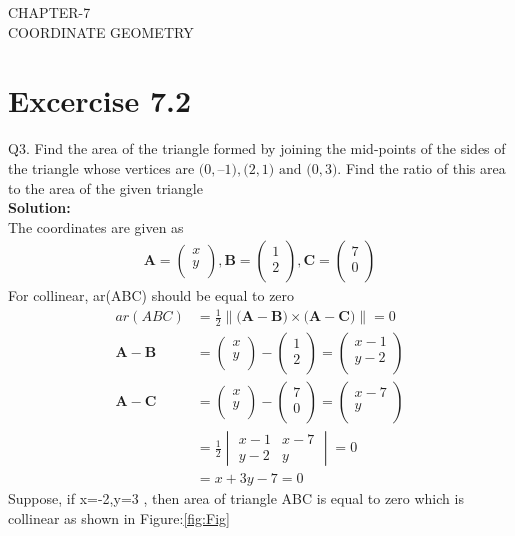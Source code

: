 \documentclass[12pt]{article}
\newcommand{\mydet}[1]{\ensuremath{\begin{vmatrix}#1\end{vmatrix}}}
\providecommand{\norm}[1]{\left\lVert#1\right\rVert}
\newcommand{\solution}{\noindent \textbf{Solution: }}
\newcommand{\myvec}[1]{\ensuremath{\begin{pmatrix}#1\end{pmatrix}}}
\let\vec\mathbf
\begin{document}
\begin{center}
\textbf\large{CHAPTER-7 \\ COORDINATE GEOMETRY}
\end{center}
\section*{Excercise 7.2}

Q3. Find the area of the triangle formed by joining the mid-points of the sides of the triangle
whose vertices are $\vec(0, –1), \vec(2, 1) \text{ and } \vec(0, 3)$. Find the ratio of this area to the area of the
given triangle
\\
\solution
\\
The coordinates are given as
	\begin{align}
	\vec{A} = \myvec{
		x\\
		y\\
		},
	\vec{B} = \myvec{
		1\\
		2\\
		},
	\vec{C} = \myvec{
		7\\
		0\\
		}
	\end{align}
For collinear, ar(ABC) should be equal to zero
	\begin{align}
		ar(ABC)&=\frac{1}{2}{\norm{\vec(\vec{A}-\vec{B})\times\vec(\vec{A}-\vec{C})}}=0\\
		\vec{A}-\vec{B} &=  \myvec{
  x \\
  y \\
 } - \myvec{
  1 \\
  2 \\
 } = \myvec{
 x-1 \\
 y-2 \\
 }
 \\
		\vec{A}-\vec{C} &=  \myvec{
  x \\
  y \\
 } - \myvec{
  7 \\
  0 \\
 } = \myvec{
 x-7 \\
 y \\
 }
 \\
		&=\frac{1}{2}\mydet{x-1 & x-7\\y-2 & y}=0\\
		&=x+3y-7=0
	\end{align}
	Suppose, if x=-2,y=3 , then area of triangle ABC is equal to zero which is collinear as shown in Figure:\ref{fig:Fig}
\end{document}
